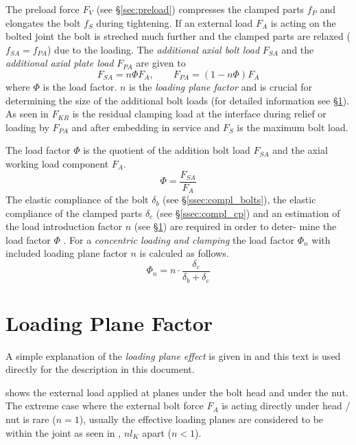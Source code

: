 The preload force $F_V$ (see §\ref{sec:preload}) compresses the clamped parts $f_P$ and elongates
the bolt $f_S$ during tightening. If an external load $F_A$ is acting on the bolted joint the bolt
is streched much further and the clamped parts are relaxed ($f_{SA}=f_{PA}$) due to the loading. 
The \emph{additional axial bolt load} $F_{SA}$ and the \emph{additional axial plate load}\footnotemark[1]
 $F_{PA}$ are given to
\begin{equation}
  F_{SA} = n \Phi F_A, \qquad F_{PA} = (1-n \Phi) F_A
  \label{equ:FSA_FPA}
\end{equation}
where $\Phi$ is the load factor. $n$ is the \emph{loading plane factor} and is crucial
for determining the size of the additional bolt loads (for detailed information see §\ref{sec:n}). 
As seen in  $F_{KR}$ is the residual
clamping load at the interface during relief or loading by $F_{PA}$ and after embedding in service and 
$F_S$ is the maximum bolt load. 

The load factor $\Phi$ is the quotient of the addition bolt load $F_{SA}$ and the axial working load
component $F_A$.
\begin{equation}
  \Phi = \frac{F_{SA}}{F_A}
\end{equation}
The elastic compliance of the bolt $\delta_b$ (see §\ref{ssec:compl_bolts}), the elastic
compliance of the clamped parts $\delta_c$ (see §\ref{ssec:compl_cp}) and an estimation
of the load introduction factor $n$ (see §\ref{sec:n}) are required in order to deter-
mine the load factor $\Phi$ \cite{VDI2230_1}. For a \emph{concentric loading and clamping} the
load factor $\Phi_n$ with included loading plane factor $n$ is calculed as follows. 
\begin{equation}
  \Phi_n = n \cdot \frac{\delta_c}{\delta_b+\delta_c}
\end{equation}

\section{Loading Plane Factor}
\label{sec:n}
A simple explanation of the \emph{loading plane effect} is given in \cite{ESAPSS} and this text is 
used directly for the description in this document. 

 shows the external load applied at planes under the bolt head and under the nut. 
The extreme case where the external bolt force $F_A$ is acting directly under head / nut is rare
($n=1$), usually the effective loading planes are considered to be within the joint as seen in 
, $n l_K$ apart ($n<1$). 

